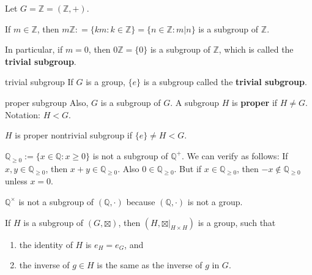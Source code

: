 \begin{ex}[$\mathbb Z$]
Let $G=\mathbb Z = (\mathbb Z, +)$.

If $m\in \mathbb Z$, then $m\mathbb Z: = \{km: k\in\mathbb Z\}=\{n\in \mathbb Z: m|n\}$ is a subgroup of $\mathbb Z$.

In particular, if $m=0$, then $0\mathbb  Z=\{0\}$ is a subgroup of $\mathbb Z$, which is called the \textbf{trivial subgroup}.
\end{ex}

\begin{defn}{trivial subgroup}
If $G$ is a group, $\{e\}$ is a subgroup called the \textbf{trivial subgroup}.
\end{defn}

\begin{defn}{proper subgroup}
Also, $G$ is a subgroup of $G$. A subgroup $H$ is \textbf{proper} if $H\ne G$. Notation: $H<G$.
\end{defn}

$H$ is proper nontrivial subgroup if $\{e\}\ne H < G$.

\begin{ex}
$\mathbb Q_{\ge 0}:= \{x\in \mathbb Q:x\ge 0\}$ is not a subgroup of $\mathbb Q^+$. We can verify as follows:
If $x,y\in \mathbb Q_{\ge 0}$, then $x+y\in \mathbb Q_{\ge 0}$. Also $0\in \mathbb Q_{\ge 0}$. But if $x\in \mathbb Q_{\ge 0}$, then $-x\not\in \mathbb Q_{\ge 0}$ unless $x=0$.


$\mathbb Q^\times$ is not a subgroup of $(\mathbb Q, \cdot)$ because $(\mathbb Q,\cdot)$ is not a group.
\end{ex}

\begin{prop}
If $H$ is a subgroup of $(G,\boxtimes)$, then $(H, \boxtimes |_{H\times H})$ is a group, such that
\begin{enumerate}[label=(\alph*)]
	\item the identity of $H$ is $e_H = e_G$, and 
	\item the inverse of $g\in H$ is the same as the inverse of $g$ in $G$.
\end{enumerate}
\end{prop}

